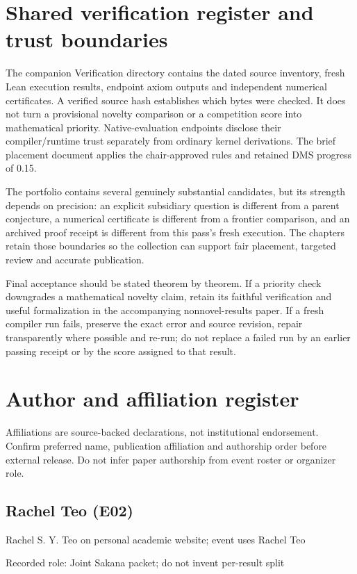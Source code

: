 \documentclass[11pt,a4paper]{article}
\begin{document}
\clearpage
\section{Shared verification register and trust boundaries}
The companion Verification directory contains the dated source inventory, fresh Lean execution results, endpoint axiom outputs and independent numerical certificates. A verified source hash establishes which bytes were checked. It does not turn a provisional novelty comparison or a competition score into mathematical priority. Native-evaluation endpoints disclose their compiler/runtime trust separately from ordinary kernel derivations. The brief placement document applies the chair-approved rules and retained DMS progress of 0.15.

The portfolio contains several genuinely substantial candidates, but its strength depends on precision: an explicit subsidiary question is different from a parent conjecture, a numerical certificate is different from a frontier comparison, and an archived proof receipt is different from this pass's fresh execution. The chapters retain those boundaries so the collection can support fair placement, targeted review and accurate publication.

Final acceptance should be stated theorem by theorem. If a priority check downgrades a mathematical novelty claim, retain its faithful verification and useful formalization in the accompanying nonnovel-results paper. If a fresh compiler run fails, preserve the exact error and source revision, repair transparently where possible and re-run; do not replace a failed run by an earlier passing receipt or by the score assigned to that result.

\clearpage
\section{Author and affiliation register}
Affiliations are source-backed declarations, not institutional endorsement. Confirm preferred name, publication affiliation and authorship order before external release. Do not infer paper authorship from event roster or organizer role.

\subsection{Rachel Teo (E02)}
Rachel S. Y. Teo on personal academic website; event uses Rachel Teo

Recorded role: Joint Sakana packet; do not invent per-result split
\end{document}
